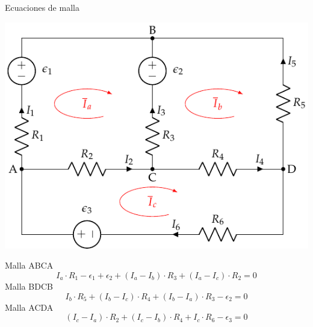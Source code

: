 \documentclass[xcolor={usenames,svgnames,dvipsnames}]{beamer}
\begin{document}
\begin{frame}[label={sec:orga6d300e}]{Ecuaciones de malla}
\begin{center}
\includegraphics[height=0.45\textheight]{figs/mallas1_corrientes.pdf}
\end{center}

Malla ABCA
\begin{equation*}
  I_a \cdot R_1 - \epsilon_1 + \epsilon_2 + (I_a - I_b) \cdot R_3 + (I_a - I_c) \cdot R_2 = 0
\end{equation*}
Malla BDCB
\begin{equation*}
  I_b \cdot R_5 + (I_b - I_c) \cdot R_4 + (I_b - I_a) \cdot R_3 - \epsilon_2 = 0
\end{equation*}
Malla ACDA
\begin{equation*}
  (I_c - I_a) \cdot R_2 + (I_c - I_b) \cdot R_4 + I_c \cdot R_6 - \epsilon_3 = 0
\end{equation*}
\end{frame}
\end{document}
